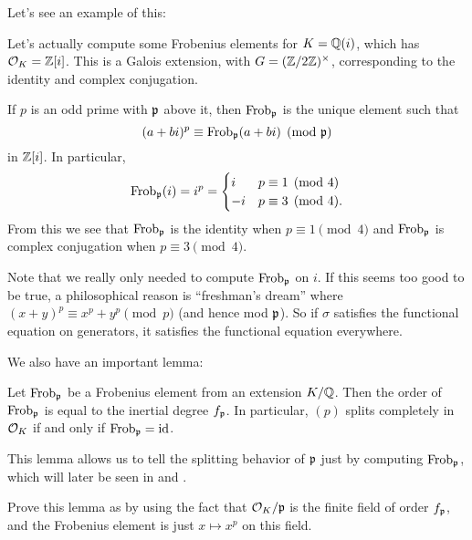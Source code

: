 Let's see an example of this:
\begin{example}
	\label{ex:frob_gaussian_integers}
	Let's actually compute some Frobenius elements for $K = \mathbb Q(i)$,
	which has $\mathcal O_K = \mathbb Z[i]$.
	This is a Galois extension, with $G = (\mathbb Z/2\mathbb Z)^\times$,
	corresponding to the identity and complex conjugation.

	If $p$ is an odd prime with $\mathfrak p$ above it,
	then $\mathrm{Frob}_\mathfrak p$ is the unique element such that
	\[ (a+bi)^p \equiv \mathrm{Frob}_\mathfrak p(a+bi) \pmod{\mathfrak p} \]
	in $\mathbb Z[i]$. In particular,
	\[ \mathrm{Frob}_\mathfrak p(i) = i^p =
		\begin{cases}
			i & p \equiv 1 \pmod 4 \\
			-i & p \equiv 3 \pmod 4.
		\end{cases}
	\]
	From this we see that $\mathrm{Frob}_\mathfrak p$ is the identity when $p \equiv 1 \pmod 4$
	and $\mathrm{Frob}_\mathfrak p$ is complex conjugation when $p \equiv 3 \pmod 4$.
\end{example}
Note that we really only needed to compute $\mathrm{Frob}_\mathfrak p$ on $i$.
If this seems too good to be true,
a philosophical reason is ``freshman's dream''
where $(x+y)^p \equiv x^p + y^p \pmod{p}$ (and hence mod $\mathfrak p$).
So if $\sigma$ satisfies the functional equation on generators,
it satisfies the functional equation everywhere.

We also have an important lemma:
\begin{lemma}
	\label{lem:order_frob}
	Let $\mathrm{Frob}_\mathfrak p$ be a Frobenius element from an extension $K/\mathbb Q$.
	Then the order of $\mathrm{Frob}_\mathfrak p$ is equal to the inertial degree $f_\mathfrak p$.
	In particular, $(p)$ splits completely in $\mathcal O_K$
	if and only if $\mathrm{Frob}_\mathfrak p = \mathrm{id}$.
\end{lemma}
This lemma allows us to tell the splitting behavior of $\mathfrak p$ just by computing
$\mathrm{Frob}_\mathfrak p$, which will later be seen in  and
.
\begin{exercise}
	Prove this lemma as by using the fact that $\mathcal O_K / \mathfrak p$
	is the finite field of order $f_\mathfrak p$,
	and the Frobenius element is just $x \mapsto x^p$ on this field.
\end{exercise}

